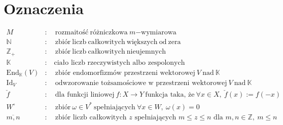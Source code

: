 \documentclass[11pt,a4paper]{report}
\theoremstyle{definition}
\begin{document}
\newpage
\chapter*{Oznaczenia}

\begin{equation*}
	\begin{aligned}
		M                                              & :\quad \mathrm{rozmaitość\ różniczkowa\ }m\mathrm{-wymiarowa}                                                                                              \\
		\mathbb{N}                                     & :\quad \mathrm{zbiór\ liczb\ całkowitych\ większych\ od\ zera}                                                                                              \\
		\mathbb{Z}_+\!                                 & :\quad \mathrm{zbiór\ liczb\ całkowitych\ nieujemnych}                                                                                                       \\
		\mathbb{K}                                     & :\quad \textrm{ciało liczb rzeczywistych albo zespolonych}                                                                                                    \\
		\textrm{End}_{\mathbb{K}}(V)                   & :\quad \textrm{zbiór endomorfizmów przestrzeni wektorowej}\ V\ \textrm{nad}\ \mathbb{K}                                                                      \\
		\textrm{Id}_V                                  & :\quad \textrm{odwzorowanie tożsamościowe w przestrzeni wektorowej}\ V\ \textrm{nad}\ \mathbb{K}                                                             \\
		\check{f}                                      & :\quad \textrm{dla funkcji liniowej}\ f: X \rightarrow Y\ \textrm{funkcja taka, że}\ \forall x \in X,\ \check{f}(x) := f(-x)                                  \\
		W^{\circ}                                      & :\quad \textrm{zbiór}\ \omega \in V^*\ \textrm{spełniających}\ \forall x \in W,\ \omega (x) = 0                                                             \\
		\overline{m,n}                                 & : \quad \textrm{zbiór liczb całkowitych\ } z \textrm{\ spełniających }  m \leq z \leq n \textrm{\ dla } m,n \in \mathbb{Z},\ m \leq n                      \\

\end{aligned}
\end{equation*}
\end{document}
